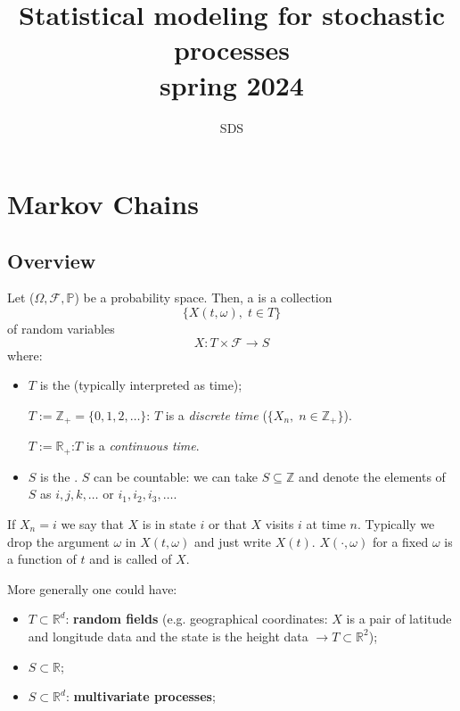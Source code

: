 \documentclass{article}
\begin{document}
\title{Statistical modeling for stochastic processes\\ spring 2024}
\author{SDS}
\date{}
\maketitle
\tableofcontents
\section{Markov Chains}
\subsection{Overview}
Let ($\Omega, \mathscr{F}, \mathbb{P}$) be a probability space. Then, a  is a collection 
\[\{X(t,\omega), \; t\in T\}\]
of random variables
\[X:T\times\mathscr{F} \longrightarrow S\]
where:
\begin{itemize}
    \item $T$ is the  (typically interpreted as time); 
    \begin{example}
        $T:= \mathbb{Z}_+=\{0,1,2,\ldots\}$: $T$ is a \textit{discrete time} ($\{X_n, \; n\in\mathbb{Z}_+\}$).
    \end{example}
    \begin{example}
        $T:=\mathbb{R_+}$:$T$ is a \textit{continuous time}.
    \end{example}
    \item $S$ is the . $S$ can be countable: we can take $S \subseteq \mathbb{Z}$ and denote the elements of $S$ as $i, j, k, \ldots$ or $i_1, i_2, i_3, \ldots$.
\end{itemize}
If $X_n=i$ we say that $X$ is in state $i$ or that $X$ visits $i$ at time $n$. Typically we drop the argument $\omega$ in $X(t,\omega)$ and just write $X(t)$. $X(\cdot,\omega)$ for a fixed $\omega$ is a function of $t$ and is called  of $X$.

More generally one could have:
\begin{itemize}
    \item $T \subset \mathbb{R}^d$: \textbf{random fields} (e.g. geographical coordinates: $X$ is a pair of latitude and longitude data and the state is the height data $\rightarrow T \subset \mathbb{R}^2$);
    \item $S \subset \mathbb{R}$;
    \item $S \subset \mathbb{R}^d$: \textbf{multivariate processes};
\end{itemize}
\end{document}
